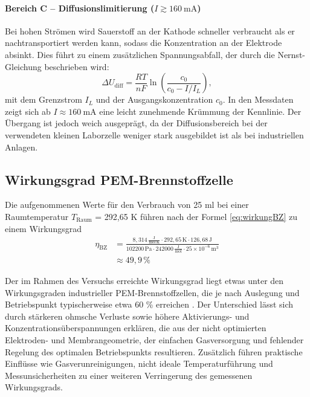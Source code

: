 \documentclass[11pt,a4paper]{article}
\numberwithin{equation}{section}
\begin{document}
\paragraph{Bereich C -- Diffusionslimitierung ($I \gtrsim \SI{160}{\milli\ampere}$)}
Bei hohen Strömen wird Sauerstoff an der Kathode schneller verbraucht als er nachtransportiert werden kann, sodass die Konzentration an der Elektrode absinkt. Dies führt zu einem zusätzlichen Spannungsabfall, der durch die Nernst-Gleichung beschrieben wird:
\begin{equation}
    \Delta U_{\text{diff}} = \frac{RT}{nF} \ln\!\left(\frac{c_0}{c_0 - I/I_L}\right),
    \label{eq:nernst}
\end{equation}
\noindent mit dem Grenzstrom $I_L$ und der Ausgangskonzentration $c_0$. In den Messdaten zeigt sich ab $I \approx \SI{160}{\milli\ampere}$ eine leicht zunehmende Krümmung der Kennlinie. Der Übergang ist jedoch weich ausgeprägt, da der Diffusionsbereich bei der verwendeten kleinen Laborzelle weniger stark ausgebildet ist als bei industriellen Anlagen.

\subsection{Wirkungsgrad PEM-Brennstoffzelle}
Die aufgenommenen Werte f\"ur den Verbrauch von 25 ml  bei einer Raumtemperatur $T_{\text{Raum}}$ = 292,65 \si{\kelvin} f\"uhren nach der Formel \ref{eq:wirkungBZ} zu einem Wirkungsgrad 
\begin{align}
    \eta_{\text{BZ}} 
    &= \frac{
        8{,}314\,\frac{\text{J}}{\text{mol}\,\text{K}}
        \cdot 292{,}65\,\text{K}
        \cdot 126{,}68\,\text{J}
    }{
        102200\,\text{Pa}
        \cdot 242000\,\frac{\text{J}}{\text{mol}}
        \cdot 25 \times 10^{-6}\,\text{m}^3
    } \\[4pt]
    &\approx 49{,}9\,\% \nonumber
\end{align}


\noindent Der im Rahmen des Versuchs erreichte Wirkungsgrad liegt etwas unter den Wirkungsgraden industrieller PEM‑Brennstoffzellen, die je nach Auslegung und Betriebspunkt typischerweise etwa 60 \%  erreichen \cite{4}. Der Unterschied l\"asst sich durch stärkeren ohmsche Verluste sowie höhere Aktivierungs- und Konzentrationsüberspannungen erklären, die aus der nicht optimierten Elektroden- und Membrangeometrie, der einfachen Gasversorgung und fehlender Regelung des optimalen Betriebspunkts resultieren. Zusätzlich führen praktische Einflüsse wie Gasverunreinigungen, nicht ideale Temperaturführung und Messunsicherheiten zu einer weiteren Verringerung des gemessenen Wirkungsgrads.
\end{document}
